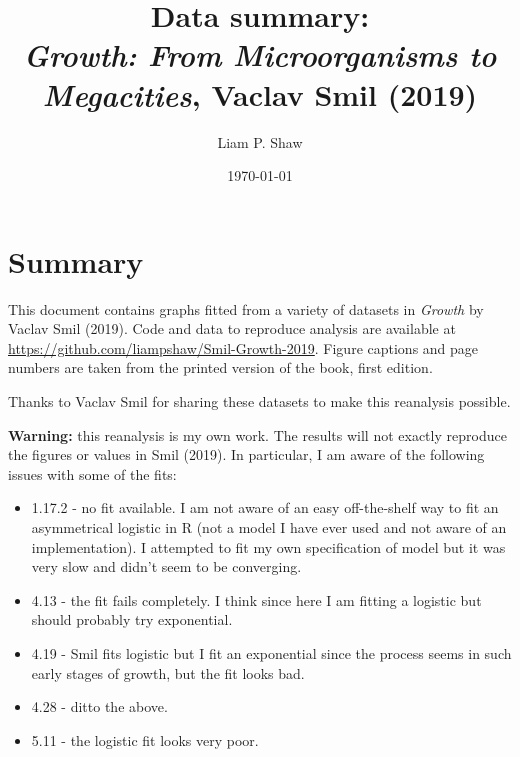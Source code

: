 \documentclass[aps,rmp,preprint,superscriptaddress,10pt,onecolumn]{article}
\begin{document}
\title{Data summary:\\\textit{Growth: From Microorganisms to Megacities}, Vaclav Smil (2019)}
\author{Liam P. Shaw}
\date{\today}


\maketitle

\section*{Summary}

\noindent This document contains graphs fitted from a variety of datasets in \textit{Growth} by Vaclav Smil (2019). Code and data to reproduce analysis are available at \url{https://github.com/liampshaw/Smil-Growth-2019}. Figure captions and page numbers are taken from the printed version of the book, first edition.

\par Thanks to Vaclav Smil for sharing these datasets to make this reanalysis possible. 

\par \textbf{Warning:} this reanalysis is my own work. The results will not exactly reproduce the figures or values in Smil (2019). In particular, I  am aware of the following issues with some of the fits:

\begin{itemize}
\item 1.17.2 - no fit available. I am not aware of an easy off-the-shelf way to fit an asymmetrical logistic in R (not a model I have ever used    and not aware of an implementation). I attempted to fit my own specification of model but it was very slow and didn't seem to be converging.
\item 4.13 - the fit fails completely. I think since here I am fitting a logistic but should probably try exponential.
\item 4.19 - Smil fits logistic but I fit an exponential since the process seems in such early stages of growth, but the fit looks bad.
\item 4.28 - ditto the above.
\item 5.11 - the logistic fit looks very poor.
\end{itemize}
\end{document}
